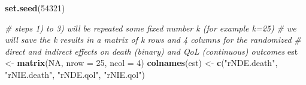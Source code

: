 \documentclass[
]{book}
\newenvironment{Shaded}{\begin{snugshade}}{\end{snugshade}}
\newcommand{\AttributeTok}[1]{\textcolor[rgb]{0.13,0.29,0.53}{#1}}
\newcommand{\CommentTok}[1]{\textcolor[rgb]{0.56,0.35,0.01}{\textit{#1}}}
\newcommand{\ConstantTok}[1]{\textcolor[rgb]{0.56,0.35,0.01}{#1}}
\newcommand{\DecValTok}[1]{\textcolor[rgb]{0.00,0.00,0.81}{#1}}
\newcommand{\FunctionTok}[1]{\textcolor[rgb]{0.13,0.29,0.53}{\textbf{#1}}}
\newcommand{\NormalTok}[1]{#1}
\newcommand{\OtherTok}[1]{\textcolor[rgb]{0.56,0.35,0.01}{#1}}
\newcommand{\StringTok}[1]{\textcolor[rgb]{0.31,0.60,0.02}{#1}}
\begin{document}
\begin{Shaded}
\begin{Highlighting}[]
\FunctionTok{set.seed}\NormalTok{(}\DecValTok{54321}\NormalTok{)}

\CommentTok{\# steps 1) to 3) will be repeated some fixed number k (for example k=25)}
\CommentTok{\# we will save the k results in a matrix of k rows and 4 columns for the randomized}
\CommentTok{\# direct and indirect effects on death (binary) and QoL (continuous) outcomes}
\NormalTok{est }\OtherTok{\textless{}{-}} \FunctionTok{matrix}\NormalTok{(}\ConstantTok{NA}\NormalTok{, }\AttributeTok{nrow =} \DecValTok{25}\NormalTok{, }\AttributeTok{ncol =} \DecValTok{4}\NormalTok{)}
\FunctionTok{colnames}\NormalTok{(est) }\OtherTok{\textless{}{-}} \FunctionTok{c}\NormalTok{(}\StringTok{"rNDE.death"}\NormalTok{, }\StringTok{"rNIE.death"}\NormalTok{, }\StringTok{"rNDE.qol"}\NormalTok{, }\StringTok{"rNIE.qol"}\NormalTok{)}


\end{Highlighting}
\end{Shaded}
\end{document}
